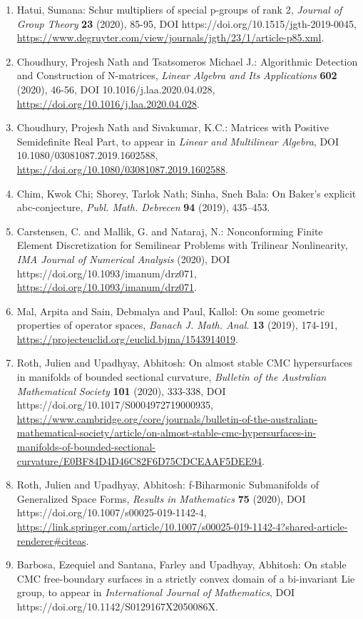 \begin{enumerate}
\item Hatui, Sumana: Schur multipliers of special p-groups of rank 2, \emph{Journal of Group Theory} {\bf 23} (2020), 85-95, DOI https://doi.org/10.1515/jgth-2019-0045, \url{https://www.degruyter.com/view/journals/jgth/23/1/article-p85.xml}.
\item Choudhury, Projesh Nath and Tsatsomeros Michael J.: Algorithmic Detection and Construction of N-matrices, \emph{Linear Algebra and Its Applications} {\bf 602} (2020), 46-56, DOI 10.1016/j.laa.2020.04.028, \url{https://doi.org/10.1016/j.laa.2020.04.028}.
\item Choudhury, Projesh Nath and Sivakumar, K.C.: Matrices with Positive Semidefinite Real Part, to appear in \emph{Linear and Multilinear Algebra}, DOI 10.1080/03081087.2019.1602588, \url{https://doi.org/10.1080/03081087.2019.1602588}.
\item Chim, Kwok Chi; Shorey, Tarlok Nath; Sinha, Sneh Bala: On Baker's explicit abc-conjecture, \emph{Publ. Math. Debrecen} {\bf 94} (2019), 435–453.
\item Carstensen, C. and Mallik, G. and Nataraj, N.: Nonconforming Finite Element Discretization for Semilinear Problems with Trilinear Nonlinearity, \emph{IMA Journal of Numerical Analysis} {\bf } (2020), DOI https://doi.org/10.1093/imanum/drz071, \url{https://doi.org/10.1093/imanum/drz071}.
\item Mal, Arpita and Sain, Debmalya and Paul, Kallol: On some geometric properties of operator spaces, \emph{Banach J. Math. Anal.} {\bf 13} (2019), 174-191, \url{https://projecteuclid.org/euclid.bjma/1543914019}.
\item Roth, Julien and Upadhyay, Abhitosh: On almost stable CMC hypersurfaces in manifolds of bounded sectional curvature, \emph{Bulletin of the Australian Mathematical Society} {\bf 101} (2020), 333-338, DOI https://doi.org/10.1017/S0004972719000935, \url{https://www.cambridge.org/core/journals/bulletin-of-the-australian-mathematical-society/article/on-almost-stable-cmc-hypersurfaces-in-manifolds-of-bounded-sectional-curvature/E0BF84D4D46C82F6D75CDCEAAF5DEE94}.
\item Roth, Julien and Upadhyay, Abhitosh: f-Biharmonic Submanifolds of Generalized Space Forms, \emph{Results in Mathematics} {\bf 75} (2020), DOI https://doi.org/10.1007/s00025-019-1142-4, \url{https://link.springer.com/article/10.1007/s00025-019-1142-4?shared-article-renderer#citeas}.
\item Barbosa, Ezequiel and Santana, Farley and Upadhyay, Abhitosh: On stable CMC free-boundary surfaces in a strictly convex domain of a bi-invariant Lie group, to appear in \emph{International Journal of Mathematics}, DOI https://doi.org/10.1142/S0129167X2050086X.
\end{enumerate}

